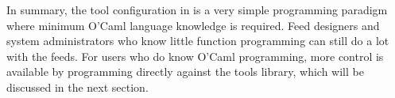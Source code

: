 In summary, the tool configuration in \padsd{} is a very simple programming 
paradigm where minimum O'Caml language knowledge is required. Feed designers
and system administrators who know little function programming can still 
do a lot with the feeds. For users who do know O'Caml programming, more control
is available by programming directly against the \padsd{} tools library, which
will be discussed in the next section.

